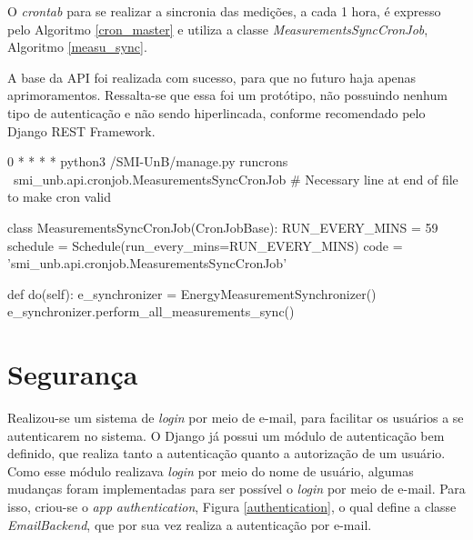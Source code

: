 O \textit{crontab} para se realizar a sincronia das medições, a cada 1 hora, é expresso pelo Algoritmo \ref{cron_master} e utiliza a classe \textit{MeasurementsSyncCronJob}, Algoritmo \ref{measu_sync}.

A base da API foi realizada com sucesso, para que no futuro haja apenas aprimoramentos. Ressalta-se que essa foi um protótipo, não possuindo nenhum tipo de autenticação e não sendo hiperlincada, conforme recomendado pelo Django REST Framework.

\begin{python}[caption={\textit{Cron} para execução da sincronia dos dados de energia.}, captionpos=b, label={cron_master}]
0 * * * * python3 /SMI-UnB/manage.py runcrons \
smi_unb.api.cronjob.MeasurementsSyncCronJob
# Necessary line at end of file to make cron valid
\end{python}

\begin{python}[caption={Classe MeasurementsSyncCronJob.}, captionpos=b, label={measu_sync}]
class MeasurementsSyncCronJob(CronJobBase):
    RUN_EVERY_MINS = 59
    schedule = Schedule(run_every_mins=RUN_EVERY_MINS)
    code = 'smi_unb.api.cronjob.MeasurementsSyncCronJob'

    def do(self):
        e_synchronizer = EnergyMeasurementSynchronizer()
        e_synchronizer.perform_all_measurements_sync()
\end{python}

\section{Segurança}
Realizou-se um sistema de \textit{login} por meio de e-mail, para facilitar os usuários a se autenticarem no sistema. O Django já possui um módulo de autenticação bem definido, que realiza tanto a autenticação quanto a autorização de um usuário. Como esse módulo realizava \textit{login} por meio do nome de usuário, algumas mudanças foram implementadas para ser possível o \textit{login} por meio de e-mail. Para isso, criou-se o \textit{app} \textit{authentication}, Figura \ref{authentication}, o qual define a classe \textit{EmailBackend}, que por sua vez realiza a autenticação por e-mail.

